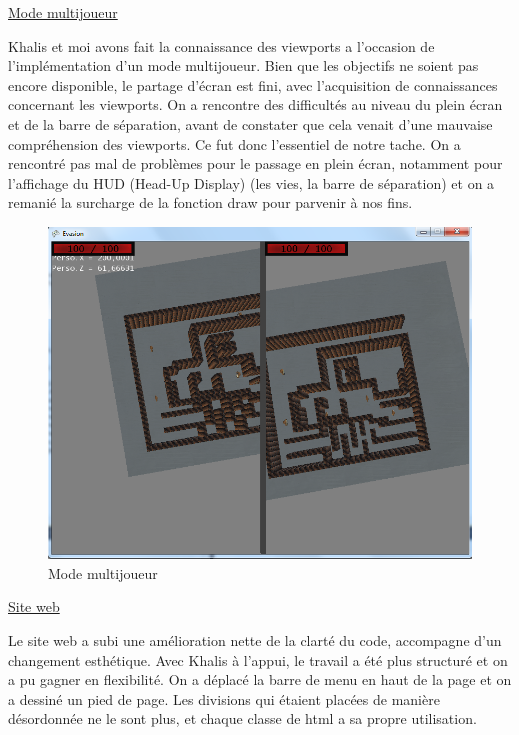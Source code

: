 \documentclass[12pt]{article}
\begin{document}
\underline {Mode multijoueur} 
\par
Khalis et moi avons fait la connaissance des viewports a l’occasion de l’implémentation d’un mode multijoueur. Bien que les objectifs ne soient pas encore disponible, le partage d’écran est fini, avec l’acquisition de connaissances concernant les viewports. On a rencontre des difficultés au niveau du plein écran et de la barre de séparation, avant de constater que cela venait d’une mauvaise compréhension des viewports. Ce fut donc l’essentiel de notre tache. On a rencontré pas mal de problèmes pour le passage en plein écran, notamment pour l’affichage du HUD (Head-Up Display) (les vies, la barre de séparation) et on a remanié la surcharge de la fonction draw pour parvenir à nos fins. 
\begin{figure}
\begin{center}
\includegraphics[scale=0.7]{multi.png}
\caption{Mode multijoueur}
\end{center}
\end{figure}
\underline {Site web} 
\par
Le site web a subi une amélioration nette de la clarté du code, accompagne d’un changement esthétique. Avec Khalis à l’appui, le travail a été plus structuré et on a pu gagner en flexibilité. On a déplacé la barre de menu en haut de la page et on a dessiné un pied de page. Les divisions qui étaient placées de manière désordonnée ne le sont plus, et chaque classe de html a sa propre utilisation.
\end{document}

